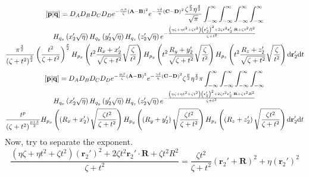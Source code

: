 \begin{multline}
  \left[\overline{\mathbf{p}}\middle|\overline{\mathbf{q}}\right] = D_A D_B D_C D_D e^{-\frac{\alpha\beta}{\zeta}\left(\mathbf{A} - \mathbf{B}\right)^2}e^{-\frac{\gamma\delta}{\eta}\left(\mathbf{C} - \mathbf{D}\right)^2}\frac{\zeta^{\frac{p}{2}}\eta^{\frac{q}{2}}}{\sqrt{\pi}} \int_{-\infty}^\infty\int_{-\infty}^\infty\int_{-\infty}^\infty\int_{-\infty}^\infty\\
  H_{q_x}\left(x_2'\sqrt{\eta}\right)H_{q_y}\left(y_2'\sqrt{\eta}\right)H_{q_z}\left(z_2'\sqrt{\eta}\right) e^{-\frac{\left(\eta\zeta + \eta t^2 + \zeta t^2\right)\left(\mathbf{r}_2'\right)^2 + 2\zeta t^2 \mathbf{r}_2'\cdot\mathbf{R} + \zeta t^2 R^2}{\zeta + t^2}} \\
  \frac{\pi^{\frac{3}{2}}}{\left(\zeta + t^2\right)^{\frac{3}{2}}}\left(\frac{t^2}{\zeta + t^2}\right)^{\frac{p}{2}} H_{p_x}\left(t^2 \frac{R_x + x_2'}{\sqrt{\zeta + t^2}}\sqrt{\frac{\zeta}{t^2}}\right)H_{p_y}\left(t^2 \frac{R_y + y_2'}{\sqrt{\zeta + t^2}}\sqrt{\frac{\zeta}{t^2}}\right)H_{p_z}\left(t^2 \frac{R_z + z_2'}{\sqrt{\zeta + t^2}}\sqrt{\frac{\zeta}{t^2}}\right) \mathrm{d}\mathbf{r}_2' \mathrm{d} t
\end{multline}
\begin{multline}
  \left[\overline{\mathbf{p}}\middle|\overline{\mathbf{q}}\right] = D_A D_B D_C D_D e^{-\frac{\alpha\beta}{\zeta}\left(\mathbf{A} - \mathbf{B}\right)^2}e^{-\frac{\gamma\delta}{\eta}\left(\mathbf{C} - \mathbf{D}\right)^2}\zeta^{\frac{p}{2}}\eta^{\frac{q}{2}}\pi \int_{-\infty}^\infty\int_{-\infty}^\infty\int_{-\infty}^\infty\int_{-\infty}^\infty\\
  H_{q_x}\left(x_2'\sqrt{\eta}\right)H_{q_y}\left(y_2'\sqrt{\eta}\right)H_{q_z}\left(z_2'\sqrt{\eta}\right) e^{-\frac{\left(\eta\zeta + \eta t^2 + \zeta t^2\right)\left(\mathbf{r}_2'\right)^2 + 2\zeta t^2 \mathbf{r}_2'\cdot\mathbf{R} + \zeta t^2 R^2}{\zeta + t^2}} \\
  \frac{t^p}{\left(\zeta + t^2\right)^{\frac{p + 3}{2}}} H_{p_x}\left(\left(R_x + x_2'\right)\sqrt{\frac{\zeta t^2}{\zeta + t^2}}\right)H_{p_y}\left(\left(R_y + y_2'\right)\sqrt{\frac{\zeta t^2}{\zeta + t^2}}\right)H_{p_z}\left(\left(R_z + z_2'\right)\sqrt{\frac{\zeta t^2}{\zeta + t^2}}\right) \mathrm{d}\mathbf{r}_2' \mathrm{d} t
\end{multline}
Now, try to separate the exponent.
\begin{equation}
  \frac{\left(\eta\zeta + \eta t^2 + \zeta t^2\right)\left(\mathbf{r}_2'\right)^2 + 2\zeta t^2 \mathbf{r}_2'\cdot\mathbf{R} + \zeta t^2 R^2}{\zeta + t^2} = \frac{\zeta t^2}{\zeta + t^2} \left(\mathbf{r}_2' + \mathbf{R}\right)^2 + \eta \left(\mathbf{r}_2'\right)^2
\end{equation}
